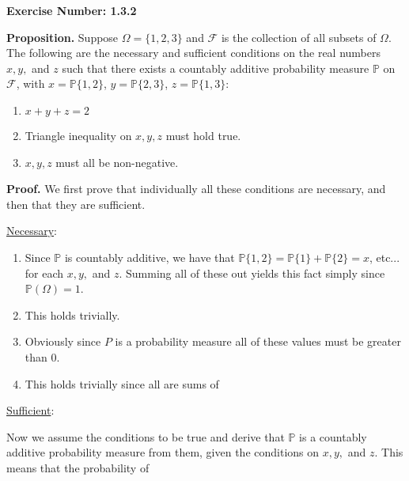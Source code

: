 \documentclass{article}
\begin{document}
\noindent \textbf{Exercise Number: 1.3.2}  %

\medskip 

\noindent \textbf{Proposition.} Suppose $\Omega = \{1,2,3\}$ and $\mathcal{F}$ is the collection of all subsets of $\Omega$. The following are the necessary and sufficient conditions on the real numbers $x,y,$ and $z$ such that there exists a countably additive probability measure $\mathbb{P}$ on $\mathcal{F}$, with $x = \mathbb{P}\{1,2\}$, $y = \mathbb{P}\{2,3\}$, $z = \mathbb{P}\{1,3\}$:

\begin{enumerate}

\item $x+ y + z = 2$

\item Triangle inequality on $x,y,z$ must hold true. 

\item $x,y,z$ must all be non-negative. 

\end{enumerate}

\bigskip

\noindent \textbf{Proof.} We first prove that individually all these conditions are necessary, and then that they are sufficient. 

\bigskip

\noindent \underline{Necessary}:

\begin{enumerate}

\item Since $\mathbb{P}$ is countably additive, we have that $\mathbb{P}\{1,2\} = \mathbb{P}\{1\} + \mathbb{P}\{2\} = x$, etc... for each $x,y,$ and $z$. Summing all of these out yields this fact simply since $\mathbb{P}(\Omega) = 1$.

\item This holds trivially. 

\item Obviously since $P$ is a probability measure all of these values must be greater than 0. 

\item This holds trivially since all are sums of  

\end{enumerate}

\medskip

\noindent \underline{Sufficient}:

Now we assume the conditions to be true and derive that $\mathbb{P}$ is a countably additive probability measure from them, given the conditions on $x,y,$ and $z$. This means that the probability of 
\end{document}

